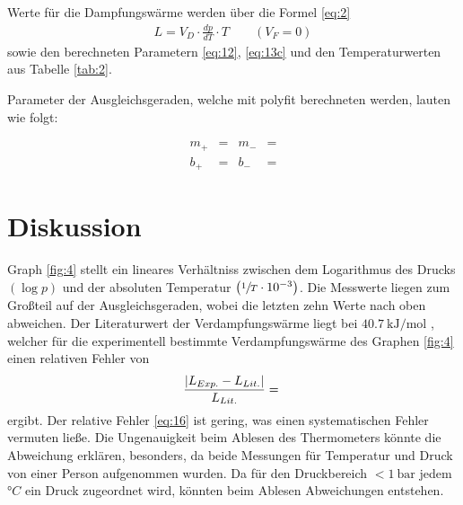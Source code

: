 \justifying Werte für die Dampfungswärme werden über die Formel \eqref{eq:2}  
\begin{align}
    L= V_D \cdot \frac{dp}{dT}\cdot T \qquad (V_F = 0) \label{eq:14}
\end{align}
sowie den berechneten Parametern \eqref{eq:12}, \eqref{eq:13c} und den Temperaturwerten aus Tabelle \ref{tab:2}.

\justifying Parameter der Ausgleichsgeraden, welche mit polyfit \cite{numpy} berechneten werden, lauten wie folgt:

\begin{subequations} \label{eq:15}
\begin{align}
    m_{+} &= \text{}  &m_{-} &=\text{}  \label{eq:15a}\\
    b_{+} &= \text{} &b_{-} &= \text{}  \label{eq:15b}
\end{align}
\end{subequations}
\newpage


\section{Diskussion}

\justifying Graph \ref{fig:4} stellt ein lineares Verhältniss zwischen dem Logarithmus des Drucks $\left( \log{p} \right)$ und 
der absoluten Temperatur $\left( \sfrac{1}{T} \cdot 10^{-3} \right)$. Die Messwerte liegen zum Großteil auf der Ausgleichsgeraden, wobei die letzten 
zehn Werte nach oben abweichen. Der Literaturwert der Verdampfungswärme liegt bei $\SI{40.7}{\kilo\joule\per\mole}$ \cite{Verdampfungswärme}, welcher
für die experimentell bestimmte Verdampfungswärme des Graphen \ref{fig:4} einen relativen Fehler von
\begin{equation}
    \frac{\lvert L_{Exp.} - L_{Lit.}\rvert}{L_{Lit.}} = \text{} \label{eq:16}
\end{equation}
ergibt. Der relative Fehler \eqref{eq:16} ist gering, was einen systematischen Fehler vermuten ließe. Die Ungenauigkeit beim Ablesen des Thermometers
könnte die Abweichung erklären, besonders, da beide Messungen für Temperatur und Druck von einer Person aufgenommen wurden. Da für den Druckbereich
$< \SI{1}{\bar}$ jedem $°C$ ein Druck zugeordnet wird, könnten beim Ablesen Abweichungen entstehen.

